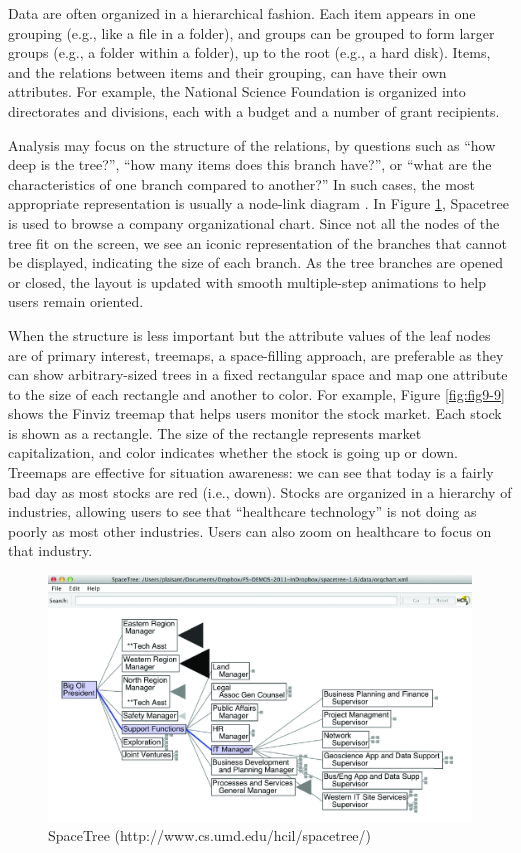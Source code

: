 \documentclass[]{krantz}
\begin{document}
Data are often organized in a hierarchical fashion. Each item appears in
one grouping (e.g., like a file in a folder), and groups can be grouped
to form larger groups (e.g., a folder within a folder), up to the root
(e.g., a hard disk). Items, and the relations between items and their
grouping, can have their own attributes. For example, the National
Science Foundation is organized into directorates and divisions, each
with a budget and a number of grant recipients.

Analysis may focus on the structure of the relations, by questions such
as ``how deep is the tree?'', ``how many items does this branch have?'',
or ``what are the characteristics of one branch compared to another?''
In such cases, the most appropriate representation is usually a
node-link diagram \citep{plaisant2002spacetree, card2002degree}. In
Figure \ref{fig:fig9-8}, Spacetree is used to browse a company
organizational chart. Since not all the nodes of the tree fit on the
screen, we see an iconic representation of the branches that cannot be
displayed, indicating the size of each branch. As the tree branches are
opened or closed, the layout is updated with smooth multiple-step
animations to help users remain oriented.

When the structure is less important but the attribute values of the
leaf nodes are of primary interest, treemaps, a space-filling approach,
are preferable as they can show arbitrary-sized trees in a fixed
rectangular space and map one attribute to the size of each rectangle
and another to color. For example, Figure \ref{fig:fig9-9} shows the
Finviz treemap that helps users monitor the stock market. Each stock is
shown as a rectangle. The size of the rectangle represents market
capitalization, and color indicates whether the stock is going up or
down. Treemaps are effective for situation awareness: we can see that
today is a fairly bad day as most stocks are red (i.e., down). Stocks
are organized in a hierarchy of industries, allowing users to see that
``healthcare technology'' is not doing as poorly as most other
industries. Users can also zoom on healthcare to focus on that industry.

\begin{figure}

{\centering \includegraphics[width=0.9\linewidth]{ChapterViz/figures/fig9-8} 

}

\caption{SpaceTree (http://www.cs.umd.edu/hcil/spacetree/)}\label{fig:fig9-8}
\end{figure}
\end{document}
